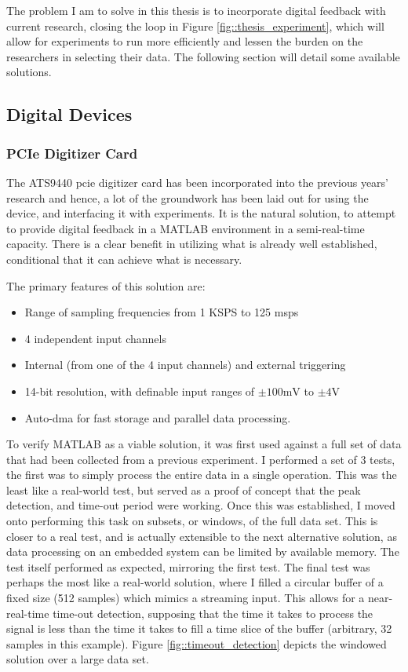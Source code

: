 The problem I am to solve in this thesis is to incorporate digital feedback with current research, closing the loop in Figure \ref{fig::thesis_experiment}, which will allow for experiments to run more efficiently and lessen the burden on the researchers in selecting their data. The following section will detail some available solutions.

\subsection{Digital Devices}
\subsubsection{PCIe Digitizer Card}
The ATS9440 \gls{pcie} digitizer card \cite{ATS9440} has been incorporated into the previous years' research and hence, a lot of the groundwork has been laid out for using the device, and interfacing it with experiments. It is the natural solution, to attempt to provide digital feedback in a MATLAB environment in a semi-real-time capacity. There is a clear benefit in utilizing what is already well established, conditional that it can achieve what is necessary.

The primary features of this solution are:
\begin{itemize}
	\item Range of sampling frequencies from 1 KSPS to 125 \gls{msps}
	\item 4 independent input channels
	\item Internal (from one of the 4 input channels) and external triggering
	\item 14-bit resolution, with definable input ranges of $\pm 100 \textrm{mV}$ to $\pm 4 \textrm{V}$
	\item Auto-\gls{dma} for fast storage and parallel data processing.
\end{itemize}

To verify MATLAB as a viable solution, it was first used against a full set of data that had been collected from a previous experiment. I performed a set of 3 tests, the first was to simply process the entire data in a single operation. This was the least like a real-world test, but served as a proof of concept that the peak detection, and time-out period were working. Once this was established, I moved onto performing this task on subsets, or windows, of the full data set. This is closer to a real test, and is actually extensible to the next alternative solution, as data processing on an embedded system can be limited by available memory. The test itself performed as expected, mirroring the first test. The final test was perhaps the most like a real-world solution, where I filled a circular buffer of a fixed size (512 samples) which mimics a streaming input. This allows for a near-real-time time-out detection, supposing that the time it takes to process the signal is less than the time it takes to fill a time slice of the buffer (arbitrary, 32 samples in this example). Figure \ref{fig::timeout_detection} depicts the windowed solution over a large data set.

